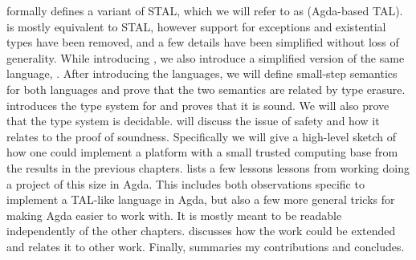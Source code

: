 \textbf{} formally defines a variant of STAL, which we will
refer to as \ATAL (Agda-based TAL). \ATAL is mostly equivalent to STAL, however
support for exceptions and existential types have been removed, and a few
details have been simplified without loss of generality. While introducing
\ATAL, we also introduce a simplified version of the same language,
\ATALe. After introducing the languages, we will define small-step semantics for
both languages and prove that the two semantics are related by type
erasure. \textbf{} introduces the type system for \ATAL and
proves that it is sound. We will also prove that the type system is
decidable. \textbf{} will discuss the issue of safety and
how it relates to the proof of soundness. Specifically we will give a high-level
sketch of how one could implement a platform with a small trusted computing base
from the results in the previous chapters. \textbf{} lists
a few lessons lessons from working doing a project of this size in Agda. This
includes both observations specific to implement a TAL-like language in Agda,
but also a few more general tricks for making Agda easier to work with. It is
mostly meant to be readable independently of the other
chapters. \textbf{} discusses how the work could be extended
and relates it to other work. Finally, \textbf{} summaries
my contributions and concludes.
